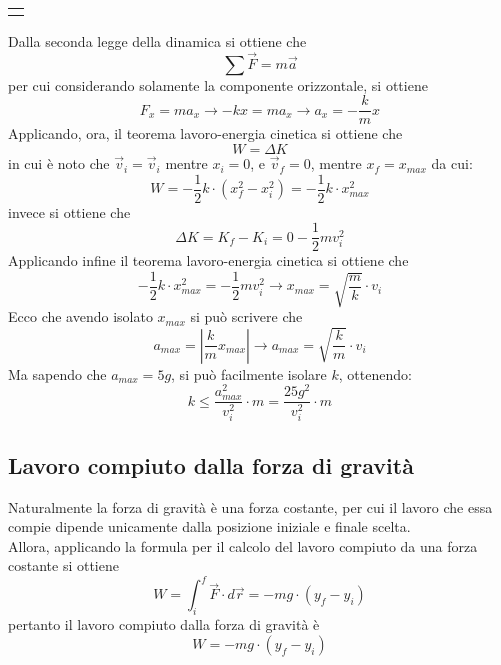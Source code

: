 \documentclass[a4paper]{extarticle}
\begin{document}
\vspace{2em}
\noindent
{}
\begin{tabularx}{\textwidth}{P}
  {
      \centering
    }
\end{tabularx}

\vspace{1em}
\noindent
Dalla seconda legge della dinamica si ottiene che
\[\sum \vec F = m \vec a\]
per cui considerando solamente la componente orizzontale, si ottiene
\[F_x = m a_x \longrightarrow -k x = m a_x \longrightarrow a_x = - \frac{k}{m} x\]
Applicando, ora, il teorema lavoro-energia cinetica si ottiene che
\[W = \Delta K\]
in cui è noto che $\vec v_i = \vec v_i$ mentre $x_i = 0$, e $\vec v_f = 0$, mentre $x_f = x_{max}$ da cui:
\[W = - \frac{1}{2}k \cdot \left(x_f^2 - x_i^2\right) = - \frac{1}{2}k \cdot x_{max}^2\]
invece si ottiene che
\[\Delta K = K_f - K_i = 0 - \frac{1}{2}m v_i^2\]
Applicando infine il teorema lavoro-energia cinetica si ottiene che
\[- \frac{1}{2}k \cdot x_{max}^2 = - \frac{1}{2}m v_i^2 \longrightarrow x_{max} = \sqrt{\frac{m}{k}} \cdot v_i\]
Ecco che avendo isolato $x_{max}$ si può scrivere che
\[a_{max} = \left \vert \frac{k}{m} x_{max} \right \vert \longrightarrow a_{max} = \sqrt{\frac{k}{m}} \cdot v_i\]
Ma sapendo che $a_{max}=5g$, si può facilmente isolare $k$, ottenendo:
\[k \leq \frac{a_{max}^2}{v_{i}^2} \cdot m = \frac{25 g^2}{v_{i}^2} \cdot m\]

\vspace{1em}
\subsection{Lavoro compiuto dalla forza di gravità}
Naturalmente la forza di gravità è una forza costante, per cui il lavoro che essa compie dipende unicamente dalla posizione iniziale e finale scelta.\\
Allora, applicando la formula per il calcolo del lavoro compiuto da una forza costante si ottiene
\[W=\int_i^f \vec F \cdot d \vec r = -mg \cdot (y_f - y_i)\]
pertanto il lavoro compiuto dalla forza di gravità è
\[\boxed{W=-mg \cdot (y_f - y_i)}\]
\end{document}
